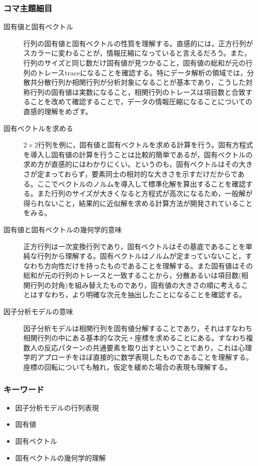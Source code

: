 \subsubsection{コマ主題細目}
\begin{description}
    \item[固有値と固有ベクトル] 
    行列の固有値と固有ベクトルの性質を理解する。直感的には，正方行列がスカラーに変わることが，情報圧縮になっていると言えるだろう。また，行列のサイズと同じ数だけ固有値が見つかること，固有値の総和が元の行列のトレースtraceになることを確認する。特にデータ解析の領域では，分散共分散行列か相関行列が分析対象になることが基本であり，こうした対称行列の固有値は実数になること，相関行列のトレースは項目数と合致することを改めて確認することで，データの情報圧縮になることについての直感的理解をめざす。
    \item[固有ベクトルを求める] 
    $2\times2$行列を例に，固有値と固有ベクトルを求める計算を行う。固有方程式を導入し固有値の計算を行うことは比較的簡単であるが，固有ベクトルの求め方が直感的にはわかりにくい。というのも，固有ベクトルはその大きさが定まっておらず，要素同士の相対的な大きさを示すだけだからである。ここでベクトルのノルムを導入して標準化解を算出することを確認する。また行列のサイズが大きくなると方程式が高次になるため，一般解が得られないこと，結果的に近似解を求める計算方法が開発されていることをみる。
    \item[固有値と固有ベクトルの幾何学的意味] 
    正方行列は一次変換行列であり，固有ベクトルはその基底であることを単純な行列から理解する。固有ベクトルはノルムが定まっていないこと，すなわち方向性だけを持ったものであることを理解する。また固有値はその総和が元の行列のトレースと一致することから，分散あるいは項目数(相関行列の対角)を組み替えたものであり，固有値の大きさの順に考えることはすなわち，より明確な次元を抽出したことになることを確認する。
    \item[因子分析モデルの意味] 
    因子分析モデルは相関行列を固有値分解することであり，それはすなわち相関行列の中にある基本的な次元・座標を求めることにある。すなわち複数人の反応パターンの共通要素を取り出すということであり，これは心理学的アプローチをほぼ直接的に数学表現したものであることを理解する。座標の回転についても触れ，仮定を緩めた場合の表現も理解する。
\end{description}
\subsubsection{キーワード}
\begin{itemize}
\item 因子分析モデルの行列表現
\item 固有値
\item 固有ベクトル
\item 固有ベクトルの幾何学的理解
\end{itemize}

